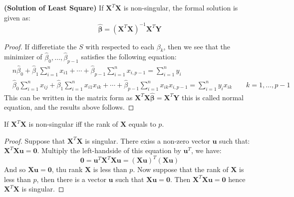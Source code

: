 \begin{proposition}{\textbf{(Solution of Least Square)}}
    If $\boldsymbol X^T\boldsymbol X$ is non-singular, the formal solution is given as:
    \begin{equation*}
        \hat{\boldsymbol \beta} = (\boldsymbol X^T\boldsymbol X)^{-1}\boldsymbol X^T\boldsymbol Y
    \end{equation*}
\end{proposition}
\begin{proof}
    If differetiate the $S$ with respected to each $\beta_k$, then we see that the minimizer of $\hat{\beta}_0,\dots,\hat{\beta}_{p-1}$ satisfies the following equation:
    \begin{equation*}
    \begin{aligned}
        &n\hat{\beta}_0 + \hat{\beta}_1\sum^n_{i=1}x_{i1} + \cdots + \hat{\beta}_{p-1}\sum^n_{i=1}x_{i,p-1} = \sum^n_{i=1}y_i \\
        &\hat{\beta}_0\sum^n_{i=1}x_{ij} + \hat{\beta}_1\sum^n_{i=1}x_{i1}x_{ik} + \cdots + \hat{\beta}_{p-1}\sum^n_{i=1}x_{ik}x_{i,p-1} = \sum^n_{i=1}y_ix_{ik} \qquad k=1,\dots,p-1
    \end{aligned}
    \end{equation*}
    This can be written in the matrix form as $\boldsymbol X^T\boldsymbol X\hat{\boldsymbol \beta} = \boldsymbol X^T\boldsymbol Y$ this is called normal equation, and the results above follows. 
\end{proof}

\begin{lemma}
    If $\boldsymbol X^T\boldsymbol X$ is non-singular iff the rank of $\boldsymbol X$ equals to $p$. 
\end{lemma}
\begin{proof}
    Suppose that $\boldsymbol X^T\boldsymbol X$ is singular. There exiss a non-zero vector $\boldsymbol u$ such that: $\boldsymbol X^T\boldsymbol X\boldsymbol u = \boldsymbol 0$. Multiply the left-handside of this equation by $\boldsymbol u^T$, we have:
    \begin{equation*}
        \boldsymbol  0 = \boldsymbol u^T\boldsymbol X^T\boldsymbol X\boldsymbol u = (\boldsymbol X\boldsymbol u)^T(\boldsymbol X\boldsymbol u)
    \end{equation*}
    And so $\boldsymbol X\boldsymbol u=\boldsymbol 0$, thu rank $\boldsymbol X$ is less than $p$. Now suppose that the rank of $\boldsymbol X$ is less than $p$, then there is a vector $\boldsymbol u$ such that $\boldsymbol X\boldsymbol u = \boldsymbol 0$. Then $\boldsymbol X^T\boldsymbol X\boldsymbol u=\boldsymbol 0$ hence $\boldsymbol X^T\boldsymbol X$ is singular.
\end{proof}

